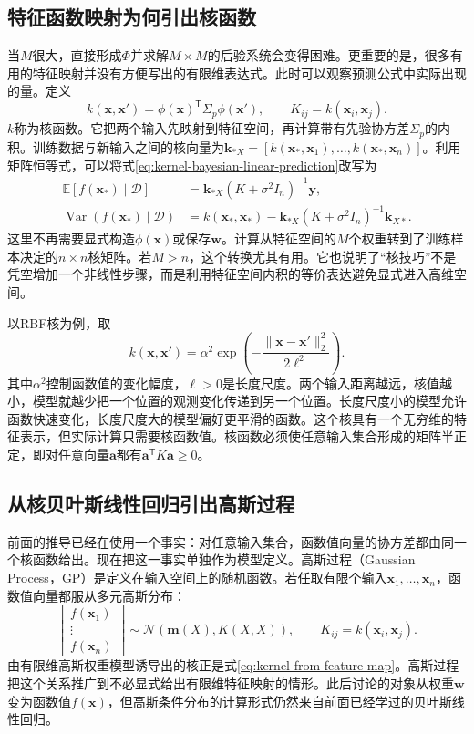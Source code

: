 \subsection{特征函数映射为何引出核函数}
当$M$很大，直接形成$\Phi$并求解$M\times M$的后验系统会变得困难。更重要的是，很多有用的特征映射并没有方便写出的有限维表达式。此时可以观察预测公式中实际出现的量。定义
\begin{equation}
 k(\bm x,\bm x')
 =\phi(\bm x)^{\mathsf T}\Sigma_p\phi(\bm x'),
 \qquad
 K_{ij}=k(\bm x_i,\bm x_j).
 \label{eq:kernel-from-feature-map}
\end{equation}
$k$称为核函数。它把两个输入先映射到特征空间，再计算带有先验协方差$\Sigma_p$的内积。训练数据与新输入之间的核向量为$\bm k_{*X}=[k(\bm x_*,\bm x_1),\ldots,k(\bm x_*,\bm x_n)]$。利用矩阵恒等式，可以将式\eqref{eq:kernel-bayesian-linear-prediction}改写为
\begin{align}
 \mathbb E[f(\bm x_*)\mid\mathcal D]
 &=\bm k_{*X}(K+\sigma^2I_n)^{-1}\bm y,\\
 \operatorname{Var}(f(\bm x_*)\mid\mathcal D)
 &=k(\bm x_*,\bm x_*)
 -\bm k_{*X}(K+\sigma^2I_n)^{-1}\bm k_{X*}.
 \label{eq:kernel-bayesian-linear-dual-prediction}
\end{align}
这里不再需要显式构造$\phi(\bm x)$或保存$\bm w$。计算从特征空间的$M$个权重转到了训练样本决定的$n\times n$核矩阵。若$M>n$，这个转换尤其有用。它也说明了“核技巧”不是凭空增加一个非线性步骤，而是利用特征空间内积的等价表达避免显式进入高维空间。

以RBF核为例，取
\begin{equation}
 k(\bm x,\bm x')=\alpha^2\exp\left(-\frac{\|\bm x-\bm x'\|_2^2}{2\ell^2}\right).
 \label{eq:gp-rbf-kernel}
\end{equation}
其中$\alpha^2$控制函数值的变化幅度，$\ell>0$是长度尺度。两个输入距离越远，核值越小，模型就越少把一个位置的观测变化传递到另一个位置。长度尺度小的模型允许函数快速变化，长度尺度大的模型偏好更平滑的函数。这个核具有一个无穷维的特征表示，但实际计算只需要核函数值。核函数必须使任意输入集合形成的矩阵半正定，即对任意向量$\bm a$都有$\bm a^{\mathsf T}K\bm a\geq0$。

\subsection{从核贝叶斯线性回归引出高斯过程}
前面的推导已经在使用一个事实：对任意输入集合，函数值向量的协方差都由同一个核函数给出。现在把这一事实单独作为模型定义。高斯过程（Gaussian Process，GP）是定义在输入空间上的随机函数。若任取有限个输入$\bm x_1,\ldots,\bm x_n$，函数值向量都服从多元高斯分布：
\begin{equation}
 \begin{bmatrix}f(\bm x_1)\\\vdots\\f(\bm x_n)\end{bmatrix}
 \sim\mathcal N\left(\bm m(X),K(X,X)\right),
 \qquad K_{ij}=k(\bm x_i,\bm x_j).
 \label{eq:gp-definition}
\end{equation}
由有限维高斯权重模型诱导出的核正是式\eqref{eq:kernel-from-feature-map}。高斯过程把这个关系推广到不必显式给出有限维特征映射的情形。此后讨论的对象从权重$\bm w$变为函数值$f(\bm x)$，但高斯条件分布的计算形式仍然来自前面已经学过的贝叶斯线性回归。

